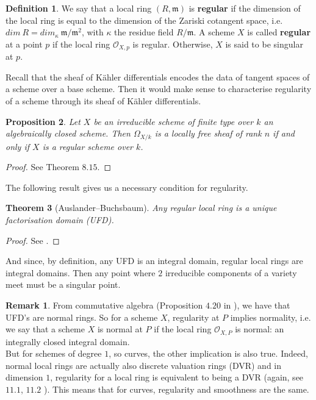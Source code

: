 \documentclass{article}
\theoremstyle{plain}
\newtheorem{theorem}{Theorem}[subsection]
\newtheorem{proposition}[theorem]{Proposition}
\theoremstyle{definition}
\newtheorem{definition}[theorem]{Definition}
\newtheorem{remark}{Remark}
\begin{document}
\begin{definition}
    We say that a local ring $(R,\mathfrak{m})$ is \textbf{regular} if the dimension of the local ring is equal to the dimension of the Zariski cotangent space, i.e. $dim\:R = dim_\kappa\: \mathfrak{m}\big/\mathfrak{m}^2$, with $\kappa$ the residue field $R/\mathfrak{m}$.
    A scheme $X$ is called \textbf{regular} at a point $p$ if the local ring $\mathcal{O}_{X,p}$ is regular. Otherwise, $X$ is said to be singular at $p$.
\end{definition}

\noindent Recall that the sheaf of K\"ahler differentials encodes the data of tangent spaces of a scheme over a base scheme.
Then it would make sense to characterise regularity of a scheme through its sheaf of K\"ahler differentials.

\begin{proposition}
\label{regularity_kahler}
    Let $X$ be an irreducible scheme of finite type over $k$ an algebraically closed scheme. 
    Then $\Omega_{X/k}$ is a locally free sheaf of rank $n$ if and only if $X$ is a regular scheme over $k$.
\end{proposition}
\begin{proof}
    See \cite{Hartshorne} Theorem $8.15$.  
\end{proof}


\noindent The following result gives us a necessary condition for regularity.

\begin{theorem}[Auslander–Buchsbaum]
    Any regular local ring is a unique factorisation domain (UFD).
\end{theorem}
\begin{proof}
    See \cite{Auslander_Buchsbaum}.
\end{proof}
\noindent And since, by definition, any UFD is an integral domain, regular local rings are integral domains. 
Then any point where $2$ irreducible components of a variety meet must be a singular point.

\begin{remark}
\label{normal_regular}
    From commutative algebra (Proposition $4.20$ in \cite{Eisenbud}), we have that UFD's are normal rings. 
    So for a scheme $X$, regularity at $P$ implies normality, i.e. we say that a scheme $X$ is normal at $P$ if the local ring $\mathcal{O}_{X,P}$ is normal: an integrally closed integral domain.\\
    But for schemes of degree $1$, so curves, the other implication is also true.
    Indeed, normal local rings are actually also discrete valuation rings (DVR) and in dimension $1$, regularity for a local ring is equivalent to being a DVR (again, see $11.1$, $11.2$ \cite{Eisenbud}).
    This means that for curves, regularity and smoothness are the same.
\end{remark}
\end{document}
